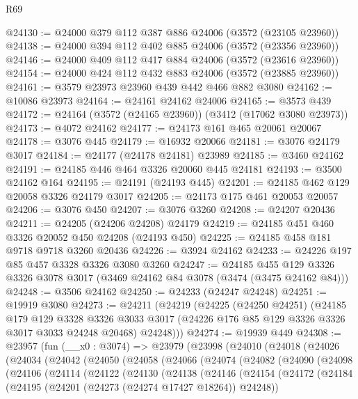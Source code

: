 \begin{lexlean}{R69}
\begin{coremodule}
@24130 := @24000 @379 @112 @387 @886 @24006 (@3572 (@23105 @23960))
@24138 := @24000 @394 @112 @402 @885 @24006 (@3572 (@23356 @23960))
@24146 := @24000 @409 @112 @417 @884 @24006 (@3572 (@23616 @23960))
@24154 := @24000 @424 @112 @432 @883 @24006 (@3572 (@23885 @23960))
@24161 := @3579 @23973 @23960 @439 @442 @466 @882 @3080
@24162 := @10086 @23973
@24164 := @24161 @24162 @24006
@24165 := @3573 @439
@24172 := @24164 (@3572 (@24165 @23960)) (@3412 (@17062 @3080 @23973))
@24173 := @4072 @24162
@24177 := @24173 @161 @465 @20061 @20067
@24178 := @3076 @445
@24179 := @16932 @20066
@24181 := @3076 @24179 @3017
@24184 := @24177 (@24178 @24181) @23989
@24185 := @3460 @24162
@24191 := @24185 @446 @464 @3326 @20060 @445 @24181
@24193 := @3500 @24162 @164
@24195 := @24191 (@24193 @445)
@24201 := @24185 @462 @129 @20058 @3326 @24179 @3017
@24205 := @24173 @175 @461 @20053 @20057
@24206 := @3076 @450
@24207 := @3076 @3260
@24208 := @24207 @20436
@24211 := @24205 (@24206 @24208) @24179
@24219 := @24185 @451 @460 @3326 @20052 @450 @24208 (@24193 @450)
@24225 := @24185 @458 @181 @9718 @9718 @3260 @20436
@24226 := @3924 @24162
@24233 := @24226 @197 @85 @457 @3328 @3326 @3080 @3260
@24247 := @24185
    @455
    @129
    @3326
    @3326
    @3078
    @3017
    (@3469 @24162 @84 @3078 (@3474 (@3475 @24162 @84)))
@24248 := @3506 @24162
@24250 := @24233 (@24247 @24248)
@24251 := @19919 @3080
@24273 := @24211
    (@24219
      (@24225
        (@24250 @24251)
        (@24185
          @179
          @129
          @3328
          @3326
          @3033
          @3017
          (@24226 @176 @85 @129 @3326 @3326 @3017 @3033 @24248 @20468)
          @24248)))
@24274 := @19939 @449
@24308 := @23957
    (fun (__x0 : @3074) =>
    @23979
      (@23998
        (@24010
          (@24018
            (@24026
              (@24034
                (@24042
                  (@24050
                    (@24058
                      (@24066
                        (@24074
                          (@24082
                            (@24090
                              (@24098
                                (@24106
                                  (@24114
                                    (@24122
                                      (@24130
                                        (@24138
                                          (@24146
                                            (@24154
                                              (@24172
                                                (@24184
                                                  (@24195
                                                    (@24201 (@24273 (@24274 @17427 @18264)) @24248))

\end{coremodule}
\end{lexlean}
